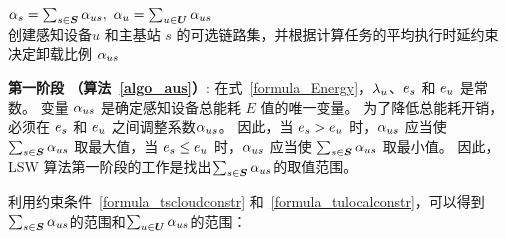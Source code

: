 \begin{algorithm}[!b]
\setstretch{\algostretch}
${\alpha}_{s} = \sum_{s \in \boldsymbol{S}}{\alpha}_{us}, \  {\alpha}_{u} = \sum_{u \in \boldsymbol{U}}{\alpha}_{us}$\\
\caption{创建感知设备$u$ 和主基站 $s$ 的可选链路集，并根据计算任务的平均执行时延约束决定卸载比例 ${\alpha}_{us}$}
\label{algo_aus}
\end{algorithm}

\textbf{第一阶段 （算法~\ref{algo_aus}）}:
在式~\eqref{formula_Energy}，${\lambda}_{u}$、$e_s$ 和 $e_u$ 是常数。
变量 ${\alpha}_{us}$ 是确定感知设备总能耗 $E$ 值的唯一变量。
为了降低总能耗开销，必须在 $e_s$ 和 $e_u$ 之间调整系数${\alpha}_{us}$。
因此，当 $e_s > e_u$ 时，${\alpha}_{us}$ 应当使 $\sum_{s \in \boldsymbol{S}}{{\alpha}_{us}}$ 取最大值，当 $e_s \leq e_u$ 时，${\alpha}_{us}$ 应当使 $\sum_{s \in \boldsymbol{S}}{{\alpha}_{us}}$ 取最小值。
因此，LSW 算法第一阶段的工作是找出$\sum_{s \in \boldsymbol{S}}{\alpha}_{us}$的取值范围。

利用约束条件~\eqref{formula_tscloudconstr} 和~\eqref{formula_tulocalconstr}，可以得到$\sum_{s \in \boldsymbol{S}}{\alpha}_{us}$的范围和$\sum_{u \in \boldsymbol{U}}{\alpha}_{us}$的范围：


